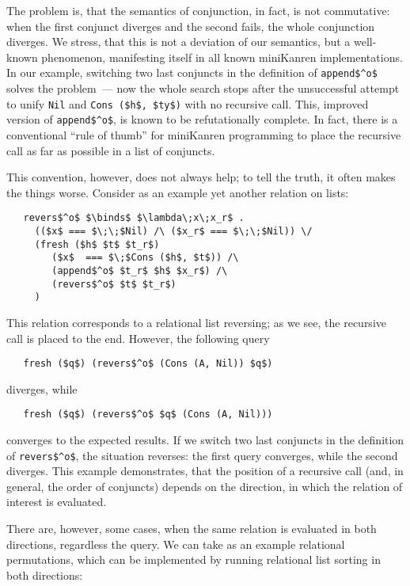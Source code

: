 The problem is, that the semantics of conjunction, in fact, is not commutative: when the first conjunct diverges and the second fails, the whole
conjunction diverges. We stress, that this is not a deviation of our semantics, but a well-known phenomenon, manifesting itself in all known
miniKanren implementations. In our example, switching two last conjuncts in the definition of \lstinline|append$^o$| solves the problem~---
now the whole search stops after the unsuccessful attempt to unify \lstinline|Nil| and \lstinline|Cons ($h$, $ty$)| with no recursive call.
This, improved version of \lstinline|append$^o$|, is known to be refutationally complete. In fact, there is a conventional ``rule of thumb''
for miniKanren programming to place the recursive call as far as possible in a list of conjuncts. 

This convention, however, does not always help; to tell the truth, it often makes the things worse. Consider 
as an example yet another relation on lists:

\begin{lstlisting}
   revers$^o$ $\binds$ $\lambda\;x\;x_r$ . 
     (($x$ === $\;\;$Nil) /\ ($x_r$ === $\;\;$Nil)) \/
     (fresh ($h$ $t$ $t_r$)
        ($x$  === $\;$Cons ($h$, $t$)) /\
        (append$^o$ $t_r$ $h$ $x_r$) /\
        (revers$^o$ $t$ $t_r$)
     )
\end{lstlisting}

This relation corresponds to a relational list reversing; as we see, the recursive call is placed to
the end. However, the following query

\begin{lstlisting}
   fresh ($q$) (revers$^o$ (Cons (A, Nil)) $q$)
\end{lstlisting}

\noindent diverges, while

\begin{lstlisting}
   fresh ($q$) (revers$^o$ $q$ (Cons (A, Nil)))
\end{lstlisting}

\noindent converges to the expected results. If we switch two last conjuncts in the definition of
\lstinline|revers$^o$|, the situation reverses: the first query converges, while the second diverges. 
This example demonstrates, that the position of a recursive call (and, in general, the order of
conjuncts) depends on the direction, in which the relation of interest is evaluated.

There are, however, some cases, when the same relation is evaluated in both directions, regardless
the query. We can take as an example relational permutations, which can be implemented by running
relational list sorting in both directions:

